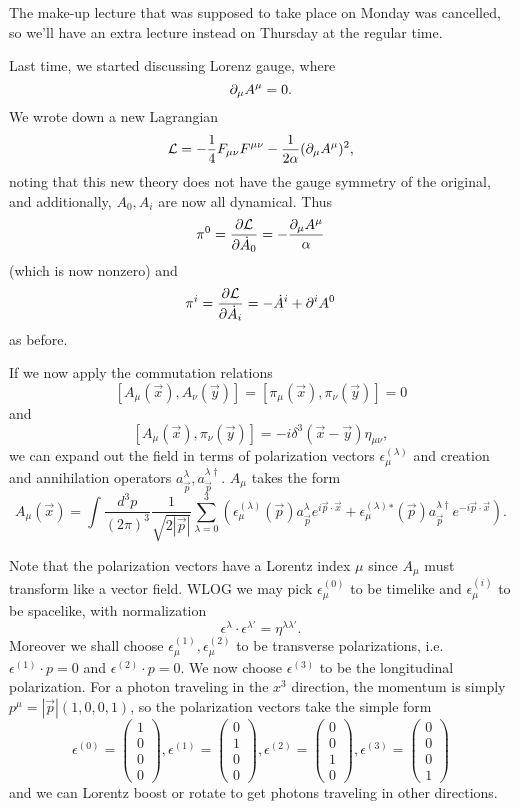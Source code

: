 The make-up lecture that was supposed to take place on Monday was cancelled, so we'll have an extra lecture instead on Thursday at the regular time.

Last time, we started discussing Lorenz gauge, where
$$\partial_\mu A^\mu=0.$$
We wrote down a new Lagrangian
$$\mathcal L=-\frac{1}{4}F_{\mu\nu}F^{\mu\nu}-\frac{1}{2\alpha}(\partial_\mu A^\mu)^2,$$
noting that this new theory does not have the gauge symmetry of the original, and additionally, $A_0, A_i$ are now all dynamical. Thus
$$\pi^0=\frac{\partial \mathcal L}{\partial \dot A_0}=-\frac{\partial_\mu A^\mu}{\alpha}$$
(which is now nonzero) and
$$\pi^i = \frac{\partial \mathcal L}{\partial \dot A_i}=-\dot A^i +\partial^i A^0$$
as before.

If we now apply the commutation relations
$$[A_\mu(\vec x),A_\nu (\vec y)]=[\pi_\mu(\vec x),\pi_\nu (\vec y)]=0$$
and
$$[A_\mu(\vec x),\pi_\nu(\vec y)]=-i \delta^3(\vec x- \vec y)\eta_{\mu\nu},$$
we can expand out the field in terms of polarization vectors $\epsilon_\mu^{(\lambda)}$ and creation and annihilation operators $a_{\vec p}^\lambda, a_{\vec p}^{\lambda\dagger}.$
$A_\mu$ takes the form
$$A_\mu(\vec x) =\int \frac{d^3p}{(2\pi)^3} \frac{1}{\sqrt{2|\vec p|}} \sum_{\lambda=0}^3 \left(\epsilon_\mu^{(\lambda)}(\vec p) a_{\vec p}^\lambda e^{i \vec p \cdot \vec x}+\epsilon_\mu^{(\lambda)}{}^* (\vec p) a_{\vec p}^{\lambda \dagger} e^{-i\vec p \cdot \vec x}\right).$$

Note that the polarization vectors have a Lorentz index $\mu$ since $A_\mu$ must transform like a vector field. WLOG we may pick $\epsilon_\mu^{(0)}$ to be timelike and $\epsilon_\mu^{(i)}$ to be spacelike, with normalization
$$\epsilon^\lambda \cdot \epsilon^{\lambda'}=\eta^{\lambda \lambda'}.$$
Moreover we shall choose $\epsilon_\mu^{(1)},\epsilon_\mu^{(2)}$ to be transverse polarizations, i.e. $\epsilon^{(1)}\cdot p = 0$ and $\epsilon^{(2)}\cdot p = 0$. We now choose $\epsilon^{(3)}$ to be the longitudinal polarization. For a photon traveling in the $x^3$ direction, the momentum is simply $p^\mu=|\vec p|(1,0,0,1)$, so the polarization vectors take the simple form
$$\epsilon^{(0)}=\begin{pmatrix}
1\\0\\0\\0\end{pmatrix},\epsilon^{(1)}=\begin{pmatrix}
0\\1\\0\\0\end{pmatrix},\epsilon^{(2)}=\begin{pmatrix}
0\\0\\1\\0\end{pmatrix},\epsilon^{(3)}=\begin{pmatrix}
0\\0\\0\\1\end{pmatrix}$$
and we can Lorentz boost or rotate to get photons traveling in other directions.

